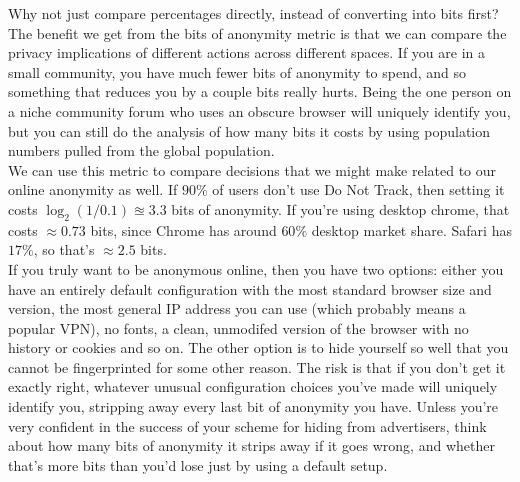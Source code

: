 \documentclass{article}
\begin{document}
Why not just compare percentages directly, instead of converting into bits first? The benefit we get from the bits of anonymity metric is that we can compare the privacy implications of different actions across different spaces. If you are in a small community, you have much fewer bits of anonymity to spend, and so something that reduces you by a couple bits really hurts. Being the one person on a niche community forum who uses an obscure browser will uniquely identify you, but you can still do the analysis of how many bits it costs by using population numbers pulled from the global population.\\

We can use this metric to compare decisions that we might make related to our online anonymity as well. If $90\%$ of users don't use Do Not Track, then setting it costs $\log_2(1/0.1) \approxeq 3.3$ bits of anonymity. If you're using desktop chrome, that costs $\approx 0.73$ bits, since Chrome has around $60\%$ desktop market share. Safari has $17\%$, so that's $\approx 2.5$ bits.\\

If you truly want to be anonymous online, then you have two options: either you have an entirely default configuration with the most standard browser size and version, the most general IP address you can use (which probably means a popular VPN), no fonts, a clean, unmodifed version of the browser with no history or cookies and so on. The other option is to hide yourself so well that you cannot be fingerprinted for some other reason. The risk is that if you don't get it exactly right, whatever unusual configuration choices you've made will uniquely identify you, stripping away every last bit of anonymity you have. Unless you're very confident in the success of your scheme for hiding from advertisers, think about how many bits of anonymity it strips away if it goes wrong, and whether that's more bits than you'd lose just by using a default setup.\\
\end{document}
